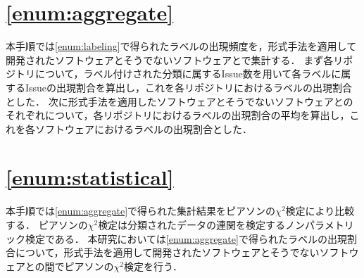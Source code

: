 \documentclass[main]{subfiles}
\begin{document}
\section{\ref{enum:aggregate}}
\label{sec:aggregate}

本手順では\ref{enum:labeling}で得られたラベルの出現頻度を，形式手法を適用して開発されたソフトウェアとそうでないソフトウェアとで集計する．
まず各リポジトリについて，ラベル付けされた分類に属するIssue数を用いて各ラベルに属するIssueの出現割合を算出し，これを各リポジトリにおけるラベルの出現割合とした．
次に形式手法を適用したソフトウェアとそうでないソフトウェアとのそれぞれについて，各リポジトリにおけるラベルの出現割合の平均を算出し，これを各ソフトウェアにおけるラベルの出現割合とした．

\section{\ref{enum:statistical}}
\label{sec:statistical}

本手順では\ref{enum:aggregate}で得られた集計結果をピアソンの\(\chi^2\)検定により比較する．
ピアソンの\(\chi^2\)検定は分類されたデータの連関を検定するノンパラメトリック検定である．
本研究においては\ref{enum:aggregate}で得られたラベルの出現割合について，形式手法を適用して開発されたソフトウェアとそうでないソフトウェアとの間でピアソンの\(\chi^2\)検定を行う．
\end{document}
